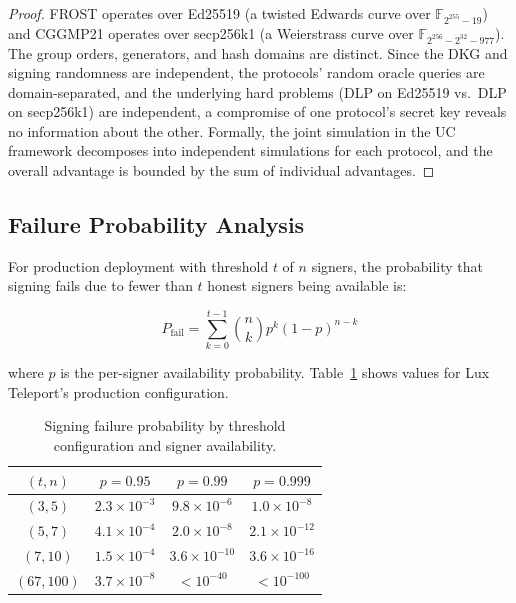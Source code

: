 \begin{proof}
FROST operates over Ed25519 (a twisted Edwards curve over $\mathbb{F}_{2^{255}-19}$)
and CGGMP21 operates over secp256k1 (a Weierstrass curve over
$\mathbb{F}_{2^{256} - 2^{32} - 977}$). The group orders, generators, and hash
domains are distinct. Since the DKG and signing randomness are independent,
the protocols' random oracle queries are domain-separated, and the underlying hard
problems (DLP on Ed25519 vs.\ DLP on secp256k1) are independent, a compromise of one
protocol's secret key reveals no information about the other. Formally, the joint
simulation in the UC framework decomposes into independent simulations for each
protocol, and the overall advantage is bounded by the sum of individual advantages.
\end{proof}

\subsection{Failure Probability Analysis}

For production deployment with threshold $t$ of $n$ signers, the probability that
signing fails due to fewer than $t$ honest signers being available is:

\begin{equation}
\label{eq:failure}
P_{\text{fail}} = \sum_{k=0}^{t-1} \binom{n}{k} p^k (1-p)^{n-k}
\end{equation}

where $p$ is the per-signer availability probability. Table~\ref{tab:failure} shows
values for Lux Teleport's production configuration.

\begin{table}[H]
\centering
\small
\begin{tabular}{@{}cccc@{}}
\toprule
$(t, n)$ & $p = 0.95$ & $p = 0.99$ & $p = 0.999$ \\
\midrule
$(3, 5)$ & $2.3 \times 10^{-3}$ & $9.8 \times 10^{-6}$ & $1.0 \times 10^{-8}$ \\
$(5, 7)$ & $4.1 \times 10^{-4}$ & $2.0 \times 10^{-8}$ & $2.1 \times 10^{-12}$ \\
$(7, 10)$ & $1.5 \times 10^{-4}$ & $3.6 \times 10^{-10}$ & $3.6 \times 10^{-16}$ \\
$(67, 100)$ & $3.7 \times 10^{-8}$ & $<10^{-40}$ & $<10^{-100}$ \\
\bottomrule
\end{tabular}
\caption{Signing failure probability by threshold configuration and signer
availability.}
\label{tab:failure}
\end{table}

